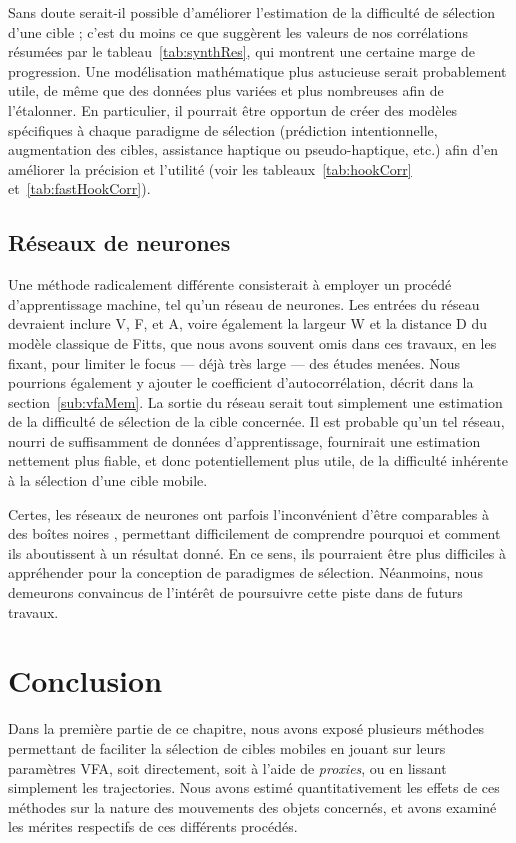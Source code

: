 	Sans doute serait-il possible d'améliorer l'estimation de la difficulté de sélection d'une cible ; c'est du moins ce que suggèrent les valeurs de nos corrélations résumées par le tableau~\ref{tab:synthRes}, qui montrent une certaine marge de progression. Une modélisation mathématique plus astucieuse serait probablement utile, de même que des données plus variées et plus nombreuses afin de l'étalonner. En particulier, il pourrait être opportun de créer des modèles spécifiques à chaque paradigme de sélection (prédiction intentionnelle, augmentation des cibles, assistance haptique ou pseudo-haptique, etc.) afin d'en améliorer la précision et l'utilité (voir les tableaux~\ref{tab:hookCorr} et~\ref{tab:fastHookCorr}).
	
	\subsection{Réseaux de neurones}
	Une méthode radicalement différente consisterait à employer un procédé d'apprentissage machine, tel qu'un réseau de neurones. Les entrées du réseau devraient inclure V, F, et A, voire également la largeur W et la distance D du modèle classique de Fitts, que nous avons souvent omis dans ces travaux, en les fixant, pour limiter le focus --- déjà très large --- des études menées. Nous pourrions également y ajouter le coefficient d'autocorrélation, décrit dans la section~\ref{sub:vfaMem}. La sortie du réseau serait tout simplement une estimation de la difficulté de sélection de la cible concernée. Il est probable qu'un tel réseau, nourri de suffisamment de données d'apprentissage, fournirait une estimation nettement plus fiable, et donc potentiellement plus utile, de la difficulté inhérente à la sélection d'une cible mobile.
	
	Certes, les réseaux de neurones ont parfois l'inconvénient d'être comparables à des \og boîtes noires \fg{}, permettant difficilement de comprendre pourquoi et comment ils aboutissent à un résultat donné. En ce sens, ils pourraient être plus difficiles à appréhender pour la conception de paradigmes de sélection. Néanmoins, nous demeurons convaincus de l'intérêt de poursuivre cette piste dans de futurs travaux.
	
	\section{Conclusion}
	Dans la première partie de ce chapitre, nous avons exposé plusieurs méthodes permettant de faciliter la sélection de cibles mobiles en jouant sur leurs paramètres VFA, soit directement, soit à l'aide de \emph{proxies}, ou en lissant simplement les trajectories. Nous avons estimé quantitativement les effets de ces méthodes sur la nature des mouvements des objets concernés, et avons examiné les mérites respectifs de ces différents procédés.
	
